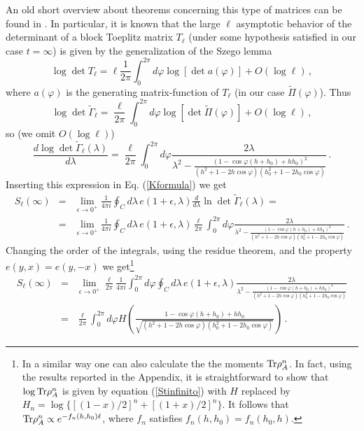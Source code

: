\documentclass[12pt,preprint,tighten,eqsecnum,aps,floats,psfig,epsfig,amsmath,onecolumn]{revtex4-1}
\def\be{\begin{equation}}
\def\ee{\end{equation}}
\def\bea{\begin{eqnarray}}
\def\eea{\end{eqnarray}}
\def\e{\epsilon}
\def\p{\varphi}
\begin{document}
An old short overview about theorems concerning this type of
matrices can be found in \cite{am-74}. 
In particular, it is known that  the large $\ell$ asymptotic 
behavior of the determinant of a block Toeplitz matrix $T_\ell$ 
(under some hypothesis satisfied in our case $t=\infty$) is 
given by the generalization of the Szego lemma \cite{am-74}
\be
\log\det T_\ell=\ell \frac{1}{2\pi}\int_0^{2\pi} d\p\log[\det a(\p)]+O(\log \ell)\,,
\ee
where $a(\p)$ is the generating matrix-function of $T_\ell$ (in our case 
$\tilde\Pi(\p)$).
Thus 
\be
\log\det \tilde{\Gamma}_\ell=
\frac{\ell}{2\pi}\int_0^{2\pi}d\p \log[\det \tilde{\Pi}(\p)]+O(\log \ell)\,,
\ee
so (we omit $O(\log \ell)$)
\be
\frac{d\log\det \tilde{\Gamma}_\ell (\lambda)}{d\lambda}=
\frac{\ell}{2\pi}\int_0^{2\pi}d\p 
\frac{2\lambda}{\lambda^2-\frac{(1-\cos\p (h+h_0)+h h_0)^2}{(h^2+1-2h\cos\p)(h_0^2+1-2h_0\cos\p)}}\,.
\ee
Inserting this expression in Eq. (\ref{Kformula}) we get
\bea
S_\ell(\infty)&=&\lim_{\e\rightarrow0^+}\frac{1}{4\pi i}
\oint_{C}d\lambda \,e(1+\e,\lambda)
\frac{d}{d\lambda}\ln\det \tilde{\Gamma}_\ell(\lambda) =\nonumber\\
&=&\lim_{\e\rightarrow0^+}
\frac{1}{4\pi i} \oint_{C}d\lambda \,e(1+\e,\lambda)
\frac{\ell}{2\pi}\int_0^{2\pi}d\p 
\frac{2\lambda}{\lambda^2-\frac{(1-\cos\p (h+h_0)+h h_0)^2}{(h^2+1-2h\cos\p)(h_0^2+1-2h_0\cos\p)}}\,.
\eea
Changing the order of the integrals, using the residue theorem, and the
property $e(y,x)=e(y,-x)$ we get\footnote{In a similar way one can also 
calculate the the moments ${\rm Tr}\rho_A^n$.
In fact, using the results reported in the Appendix, it is straightforward
to show that $\log {\rm Tr}\rho_A^n$ is given by equation
(\ref{Stinfinito}) with $H$ replaced by $H_n=\log\{[(1-x)/2]^n+[(1+x)/2]^n\}$.
It follows that ${\rm Tr}\rho_A^n\propto e^{-f_n(h,h_0)\ell}$, 
where $f_n$ satisfies $f_n(h,h_0)=f_n(h_0,h)$.}
\bea
S_\ell(\infty)&=&\lim_{\e\rightarrow0^+}
\frac{\ell}{2\pi}\frac{1}{4\pi i} \int_0^{2\pi}d\p 
\oint_{C}d\lambda \,e(1+\e,\lambda) 
\frac{2\lambda}{\lambda^2-\frac{(1-\cos\p (h+h_0)+h h_0)^2}{(h^2+1-2h\cos\p)(h_0^2+1-2h_0\cos\p)}}\nonumber\\
&=&\frac{\ell}{2\pi}\int_0^{2\pi} d\p H\left(
\frac{1-\cos\p (h+h_0)+h h_0}{\sqrt{(h^2+1-2h\cos\p)(h_0^2+1-2h_0\cos\p)}}
\right)\,.
\label{Stinfinito}
\eea
\end{document}
